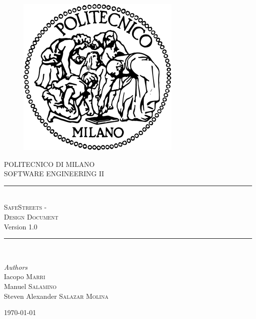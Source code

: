\documentclass[11pt,a4paper]{article}
\begin{document}
\begin{figure}[t]
    \includegraphics[scale=0.8]{Images/logo_polimi.png}
    \centering
\end{figure}

\begin{titlepage}
    \newcommand{\HRule}{\rule{\linewidth}{0.5mm}}
    \center
    \textsc{\LARGE POLITECNICO DI MILANO}\\[1.5cm]
	
	\textsc{\Large SOFTWARE ENGINEERING II}\\[0.5cm]
	
	\HRule\\[0.4cm]
	    {\huge \textsc{SafeStreets - \\Design Document}}\\[0.4cm]
	    Version 1.0
    \HRule\\[1.5cm]
	
	\begin{minipage}{1\textwidth}
		\begin{flushleft}
			\large
			\textit{Authors}\\
			Iacopo \textsc{Marri}\\
			Manuel \textsc{Salamino}\\
			Steven Alexander \textsc{Salazar Molina}
		\end{flushleft}
	\end{minipage}
	
	\vfill\vfill\vfill %
	
	{\large\today}
	
\end{titlepage}


\newpage

\tableofcontents







%
\end{document}
